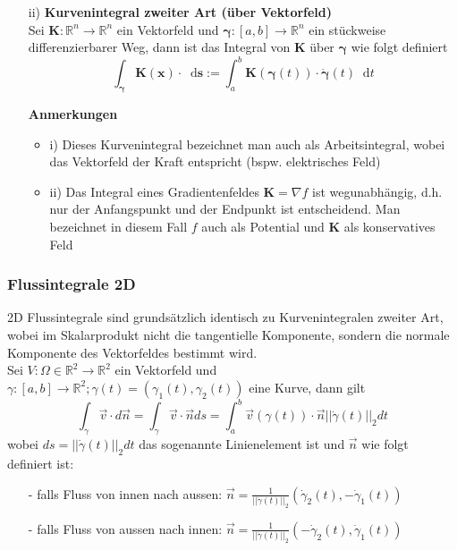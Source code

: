 \documentclass[8pt, a4paper, landscape, fleqn]{scrartcl}
\newenvironment {annotation}[1]
				{\begin{itshape} \begin{small} \textbf{#1} \begin{itemize}}
				{\end{itemize} \end{small} \end{itshape}}
\providecommand{\diff}{\mathop{} \! \mathrm{d}}
\begin{document}
\begin{multicols*}{3}
\begin{itemize}
						\item[ii)] \textbf{Kurvenintegral zweiter Art (über Vektorfeld)}\\
						Sei $\textbf{K}: \mathbb{R}^n \rightarrow \mathbb{R}^n$ ein Vektorfeld und $\bm{\gamma}: [a, b] \rightarrow \mathbb{R}^n$ ein stückweise differenzierbarer Weg, dann ist das Integral von $\textbf{K}$ über $\bm{ \gamma}$ wie folgt definiert
						\[\int_{\bm{\gamma}} \textbf{K}(\textbf{x}) \cdot \diff \textbf{s} := \int_a^b \textbf{K}(\bm{\gamma}(t)) \cdot \dot{\bm{\gamma}}(t) \diff t\]
						\begin{annotation}{Anmerkungen}
							\item[i)] Dieses Kurvenintegral bezeichnet man auch als Arbeitsintegral, wobei das Vektorfeld der Kraft entspricht (bspw. elektrisches Feld)
							\item[ii)] Das Integral eines Gradientenfeldes $\bm{K}= \nabla f$ ist wegunabhängig, d.h. nur der Anfangspunkt und der Endpunkt ist entscheidend. Man bezeichnet in diesem Fall $f$ auch als Potential und $\bm{K}$ als konservatives Feld
						\end{annotation}
					\end{itemize}
				\subsubsection{Flussintegrale 2D}
				    2D Flussintegrale sind grundsätzlich identisch zu Kurvenintegralen zweiter Art, wobei im Skalarprodukt nicht die tangentielle Komponente, sondern die normale Komponente des Vektorfeldes bestimmt wird.\\
				    Sei $V: \Omega \in \mathbb{R}^2 \rightarrow \mathbb{R}^2$ ein Vektorfeld und $\gamma : [a,b] \rightarrow \mathbb{R}^2; \gamma(t) = (\gamma_1(t), \gamma_2(t))$ eine Kurve, dann gilt
				    \[\int_{\gamma} \vec{v} \cdot d\vec{n} = \int_{\gamma} \vec{v} \cdot \vec{n} ds = \int_a^b \vec{v}(\gamma(t)) \cdot \vec{n} \vert \vert \dot\gamma(t)\vert\vert_2 dt\]
				    wobei $ds = \vert \vert \dot\gamma(t)\vert\vert_2 dt$ das sogenannte Linienelement ist und $\vec{n}$ wie folgt definiert ist:
				    \begin{itemize}
				        \item[-] falls Fluss von innen nach aussen: $\vec{n} = \frac{1}{\vert \vert \dot\gamma(t)\vert\vert_2}(\dot \gamma_2(t), -\dot \gamma_1(t))$
				        \item[-] falls Fluss von aussen nach innen: $\vec{n} = \frac{1}{\vert \vert \dot\gamma(t)\vert\vert_2}(-\dot \gamma_2(t), \dot \gamma_1(t))$
				    \end{itemize}

\end{multicols*}
\end{document}
